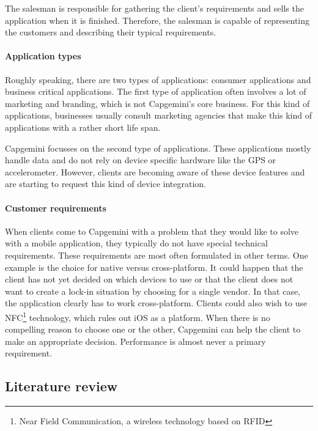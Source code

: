 The salesman is responsible for gathering the client's requirements and sells the application when it is finished. Therefore, the salesman is capable of representing the customers and describing their typical requirements.

\paragraph{Application types}

Roughly speaking, there are two types of applications: consumer applications and business critical applications. The first type of application often involves a lot of marketing and branding, which is not Capgemini's core business. For this kind of applications, businesses usually consult marketing agencies that make this kind of applications with a rather short life span.

Capgemini focusses on the second type of applications. These applications mostly handle data and do not rely on device specific hardware like the GPS or accelerometer. However, clients are becoming aware of these device features and are starting to request this kind of device integration. 

\paragraph{Customer requirements} 

When clients come to Capgemini with a problem that they would like to solve with a mobile application, they typically do not have special technical requirements. These requirements are most often formulated in other terms. One example is the choice for native versus cross-platform. It could happen that the client has not yet decided on which devices to use or that the client does not want to create a lock-in situation by choosing for a single vendor. In that case, the application clearly has to work cross-platform. Clients could also wish to use NFC\footnote{Near Field Communication, a wireless technology based on RFID} technology, which rules out iOS as a platform. When there is no compelling reason to choose one or the other, Capgemini can help the client to make an appropriate decision. Performance is almost never a primary requirement.

\subsection{Literature review}

